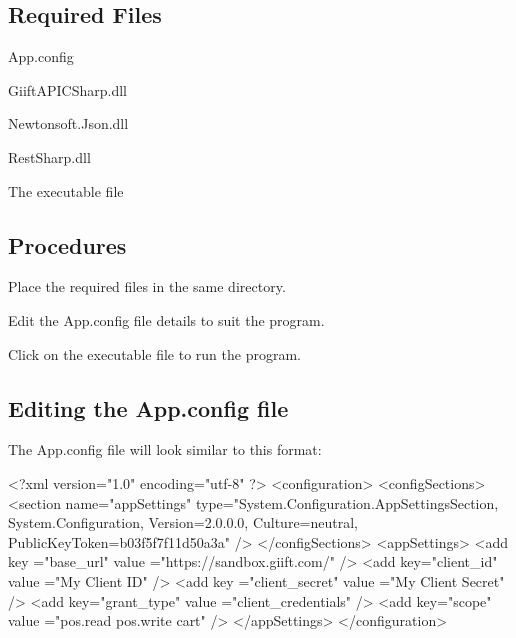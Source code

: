 \subsection*{Required Files}


\begin{DoxyEnumerate}
\item App.\+config
\item Giift\+A\+P\+I\+C\+Sharp.\+dll
\item Newtonsoft.\+Json.\+dll
\item Rest\+Sharp.\+dll
\item The executable file 


\end{DoxyEnumerate}

\subsection*{Procedures}


\begin{DoxyEnumerate}
\item Place the required files in the same directory.
\item Edit the App.\+config file details to suit the program.
\item Click on the executable file to run the program. 


\end{DoxyEnumerate}

\subsection*{Editing the App.\+config file}

The App.\+config file will look similar to this format\+:

\begin{DoxyVerb}<?xml version="1.0" encoding="utf-8" ?>
<configuration>
    <configSections>
        <section 
            name="appSettings" 
            type="System.Configuration.AppSettingsSection, System.Configuration, Version=2.0.0.0, Culture=neutral, PublicKeyToken=b03f5f7f11d50a3a" 
            />
    </configSections>
  <appSettings>
    <add key ="base_url" value ="https://sandbox.giift.com/" />
    <add key="client_id" value ="My Client ID" />
    <add key ="client_secret" value ="My Client Secret" />
    <add key="grant_type" value ="client_credentials" />
    <add key="scope" value ="pos.read pos.write cart" />
  </appSettings>
</configuration>
\end{DoxyVerb}



